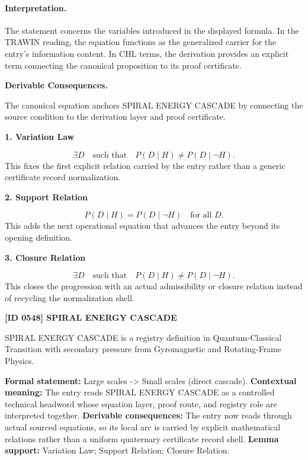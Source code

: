 \paragraph{Interpretation.}
The statement concerns the variables introduced in the displayed formula. In the TRAWIN reading, the equation functions as the generalized carrier for the entry’s information content. In CHL terms, the derivation provides an explicit term connecting the canonical proposition to its proof certificate.

\par\vspace{0.35em}
\noindent\textbf{Derivable Consequences.}\quad
\begingroup
\footnotesize
\raggedright
The canonical equation anchors SPIRAL ENERGY CASCADE by connecting the source condition to the derivation layer and proof certificate.
\par\endgroup

\noindent\textbf{1. Variation Law}\par
\[
\exists D \quad\text{such that}\quad P(D\mid H)\neq P(D\mid \neg H).
\]
\noindent This fixes the first explicit relation carried by the entry rather than a generic certificate record normalization.\par
\noindent\textbf{2. Support Relation}\par
\[
P(D\mid H)=P(D\mid \neg H) \quad \text{for all }D.
\]
\noindent This adds the next operational equation that advances the entry beyond its opening definition.\par
\noindent\textbf{3. Closure Relation}\par
\[
\boxed{ \exists D \quad\text{such that}\quad P(D\mid H)\neq P(D\mid \neg H). }
\]
\noindent This closes the progression with an actual admissibility or closure relation instead of recycling the normalization shell.\par

\clearpage
\noindent\textbf{[ID 0548] SPIRAL ENERGY CASCADE}\par
\vspace{0.35em}
\begingroup\small
{}
SPIRAL ENERGY CASCADE is a registry definition in Quantum-Classical Transition with secondary pressure from Gyromagnetic and Rotating-Frame Physics.

\begingroup\footnotesize\setlength{\emergencystretch}{3em}\sloppy
\textbf{Formal statement:} Large scales -> Small scales (direct cascade). \textbf{Contextual meaning:} The entry reads SPIRAL ENERGY CASCADE as a controlled technical headword whose equation layer, proof route, and registry role are interpreted together. \textbf{Derivable consequences:} The entry now reads through actual sourced equations, so its local arc is carried by explicit mathematical relations rather than a uniform quaternary certificate record shell. \textbf{Lemma support:} Variation Law; Support Relation; Closure Relation.\par
\endgroup

